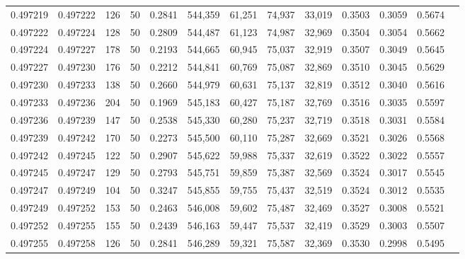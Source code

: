 \begin{tabular}{rrrrrrrrrrrrr}
0.497219 & 0.497222 &   126 &  50 &                                     0.2841 & 544,359 &  61,251 &  74,937 &  33,019 & 0.3503 & 0.3059 & 0.5674 \\
0.497222 & 0.497224 &   128 &  50 &                                     0.2809 & 544,487 &  61,123 &  74,987 &  32,969 & 0.3504 & 0.3054 & 0.5662 \\
0.497224 & 0.497227 &   178 &  50 &                                     0.2193 & 544,665 &  60,945 &  75,037 &  32,919 & 0.3507 & 0.3049 & 0.5645 \\
0.497227 & 0.497230 &   176 &  50 &                                     0.2212 & 544,841 &  60,769 &  75,087 &  32,869 & 0.3510 & 0.3045 & 0.5629 \\
0.497230 & 0.497233 &   138 &  50 &                                     0.2660 & 544,979 &  60,631 &  75,137 &  32,819 & 0.3512 & 0.3040 & 0.5616 \\
0.497233 & 0.497236 &   204 &  50 &                                     0.1969 & 545,183 &  60,427 &  75,187 &  32,769 & 0.3516 & 0.3035 & 0.5597 \\
0.497236 & 0.497239 &   147 &  50 &                                     0.2538 & 545,330 &  60,280 &  75,237 &  32,719 & 0.3518 & 0.3031 & 0.5584 \\
0.497239 & 0.497242 &   170 &  50 &                                     0.2273 & 545,500 &  60,110 &  75,287 &  32,669 & 0.3521 & 0.3026 & 0.5568 \\
0.497242 & 0.497245 &   122 &  50 &                                     0.2907 & 545,622 &  59,988 &  75,337 &  32,619 & 0.3522 & 0.3022 & 0.5557 \\
0.497245 & 0.497247 &   129 &  50 &                                     0.2793 & 545,751 &  59,859 &  75,387 &  32,569 & 0.3524 & 0.3017 & 0.5545 \\
0.497247 & 0.497249 &   104 &  50 &                                     0.3247 & 545,855 &  59,755 &  75,437 &  32,519 & 0.3524 & 0.3012 & 0.5535 \\
0.497249 & 0.497252 &   153 &  50 &                                     0.2463 & 546,008 &  59,602 &  75,487 &  32,469 & 0.3527 & 0.3008 & 0.5521 \\
0.497252 & 0.497255 &   155 &  50 &                                     0.2439 & 546,163 &  59,447 &  75,537 &  32,419 & 0.3529 & 0.3003 & 0.5507 \\
0.497255 & 0.497258 &   126 &  50 &                                     0.2841 & 546,289 &  59,321 &  75,587 &  32,369 & 0.3530 & 0.2998 & 0.5495 \\

\end{tabular}
